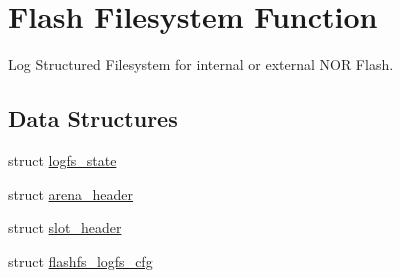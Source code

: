 \hypertarget{group___p_i_o_s___f_l_a_s_h_f_s}{\section{Flash Filesystem Function}
\label{group___p_i_o_s___f_l_a_s_h_f_s}
}


Log Structured Filesystem for internal or external N\-O\-R Flash.  


\subsection*{Data Structures}
\begin{DoxyCompactItemize}
\item 
struct \hyperlink{structlogfs__state}{logfs\-\_\-state}
\item 
struct \hyperlink{structarena__header}{arena\-\_\-header}
\item 
struct \hyperlink{structslot__header}{slot\-\_\-header}
\item 
struct \hyperlink{structflashfs__logfs__cfg}{flashfs\-\_\-logfs\-\_\-cfg}
\end{DoxyCompactItemize}
